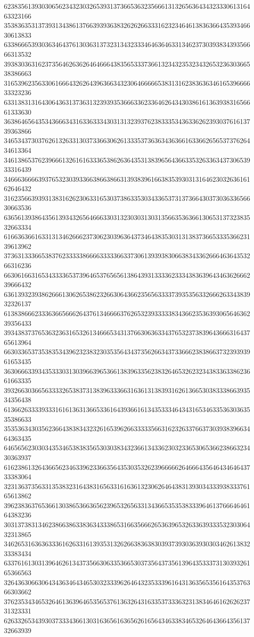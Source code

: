 62383561393030656234323032653931373665363235666131326563643432333061316463323166
35383635313739313438613766393936383262626633316232346461383636643539346630613833
63386665393036346437613036313732313432333464636463313462373039383439356666313532
39383036316237356462636264646664383565333736613234323532343265323630366538386663
31653962356330616664326264396366343230646666653831316238363634616539666633323236
63313831316430643631373631323939353666336233646264343038616136393831656661333630
36386465643534366634316336333430313132393762383335343633626239303761613739363866
34653437303762613263313037336630626133353736363436366163366265653737626434613364
34613865376239666132616163336538626364353138396564366335326336343730653933316439
34666366663937653230393366386638663139383961663835393031316462303263616162646432
31623566393931383162623063316530373863353034336537313736643037303633656630663536
63656139386435613934326564666330313230303130313566353636613065313732383532663334
61663636616331313462666237306230396364373464383530313138373665333536623139613962
37363133366538376233333866663333366337306139393830663834336266646364353266316236
66306166316534333365373964653765656138643931333362333438363964346362666239666432
63613932393862666130626538623266306436623565633337393535633266626334383932326137
61383866623336366566626437613466663762653239333338343662353639306564636239356433
39343837376536323631653261346665343137663063633437653237383964366631643765613964
66303365373538353439623238323035356434373562663437336662383866373239393961653435
36306663393435333031303966396536613839633562383264653262323438336338623661663335
39326630366563333265383731383963336631636131383931626136653038333866393534356438
61366263333933316161363136653361643936616134353334643431653463353630363535386633
35353634303562366438383432326165396266333335663162326337663730393839663464363435
64656562303034353465383835653030383432366134336230323365306536623866323430363937
61623861326436656234633962336635643530353262396666626466643564643464643733383064
32313637356331353832316438316563316163613230626464383139303433393833376165613862
39623836376536613038653663656239653265633134366535353833396461376664646164383236
30313738313462386638633836343338653166356662653639653263363933353230306432313865
34626531636363336162633161393531326266383638303937393036393030346261383233383434
63376161303139646261343735663063353665303735643735613964353337313039326165366563
32643630663064343634643465303233396264643235333961643136356535616435376366303662
37623534346532646136396465356537613632643163353733363231383464616262623731323331
62633265343930373334366130316365616365626165643463383465326464366435613732663939
